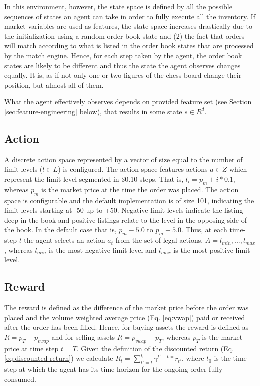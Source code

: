 In this environment, however, the state space is defined by all the possible sequences of states an agent can take in order to fully execute all the inventory.
If market variables are used as features, the state space increases drastically due to the initialization using a random order book state and (2) the fact that orders will match according to what is listed in the order book states that are processed by the match engine.
Hence, for each step taken by the agent, the order book states are likely to be different and thus the state the agent observes changes equally. 
It is, as if not only one or two figures of the chess board change their position, but almost all of them.

What the agent effectively observes depends on provided feature set (see Section \ref{sec:feature-engineering} below), that results in some state $s \in R^d$.

\subsection{Action}

A discrete action space represented by a vector of size equal to the number of limit levels ($l \in L$) is configured. 
The action space features actions $a \in Z$ which represent the limit level segmented in \$0.10 steps.
That is, $l_i = p_m + i * 0.1$, whereas $p_m$ is the market price at the time the order was placed.
The action space is configurable and the default implementation is of size 101, indicating the limit levels starting at -50 up to +50.
Negative limit levels indicate the listing deep in the book and positive listings relate to the level in the opposing side of the book.
In the default case that is, $p_m - 5.0$ to $p_m + 5.0$. 
Thus, at each time-step $t$ the agent selects an action $a_t$ from the set of legal actions, $A = {l_{min}, . . . , l_{max}}$, whereas $l_{min}$ is the most negative limit level and $l_{max}$ is the most positive limit level.

\subsection{Reward}

The reward is defined as the difference of the market price before the order was placed and the volume weighted average price (Eq. \ref{eq:vwap}) paid or received after the order has been filled. 
Hence, for buying assets the reward is defined as $R=p_{T}-p_{vwap}$ and for selling assets $R=p_{vwap}-p_T$, whereas $p_T$ is the market price at time step $t=T$.
Given the definition of the discounted return (Eq. \ref{eq:discounted-return}) we calculate $R_t=\sum_{t'=t}^{t_0}{\gamma^{t'-t}*r_{t'}}$, where $t_0$ is the time step at which the agent has its time horizon for the ongoing order fully consumed.

